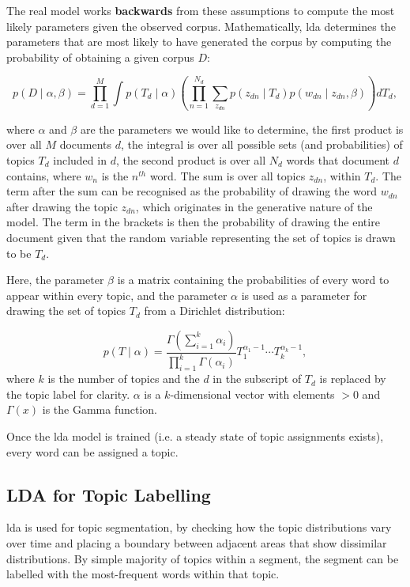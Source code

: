     The real \gls{model} works \textbf{backwards} from these assumptions to compute the most likely parameters given the observed corpus.
    Mathematically, \gls{lda} determines the parameters that are most likely to have generated the corpus by computing the probability of obtaining a given corpus $D$:

    \begin{equation}
        p(D \mid \alpha, \beta)=\prod_{d=1}^{M} \int p\left(T_{d} \mid \alpha\right)\left(\prod_{n=1}^{N_{d}} \sum_{z_{d n}} p\left(z_{d n} \mid T_{d}\right) p\left(w_{d n} \mid z_{d n}, \beta\right)\right) d T_{d},
    \end{equation}

    where $\alpha$ and $\beta$ are the parameters we would like to determine,
    the first product is over all $M$ documents $d$,
    the integral is over all possible sets (and probabilities) of topics $T_d$ included in $d$,
    the second product is over all $N_d$ words that document $d$ contains, where $w_n$ is the $n^{th}$ word.
    The sum is over all topics $z_{dn}$, within $T_d$.
    The term after the sum can be recognised as the probability of drawing the word $w_{dn}$ after drawing the topic $z_{dn}$, which originates in the generative nature of the \gls{model}.
    The term in the brackets is then the probability of drawing the entire document given that the random variable representing the set of topics is drawn to be $T_d$.

    Here, the parameter $\beta$ is a matrix containing the probabilities of every word to appear within every topic, and the parameter $\alpha$ is used as a parameter for drawing the set of topics $T_d$ from a Dirichlet distribution:

    \begin{equation}
        p(T \mid \alpha)=\frac{\Gamma\left(\sum_{i=1}^{k} \alpha_{i}\right)}{\prod_{i=1}^{k} \Gamma\left(\alpha_{i}\right)} T_{1}^{\alpha_{1}-1} \cdots T_{k}^{\alpha_{k}-1},
    \end{equation}
    where $k$ is the number of topics and the $d$ in the subscript of $T_d$ is replaced by the topic label for clarity. $\alpha$ is a $k$-dimensional vector with elements $> 0$ and $\Gamma(x)$ is the Gamma function.

    Once the \gls{lda} \gls{model} is trained (i.e. a steady state of topic assignments exists), every word can be assigned a topic.


    \subsection{LDA for Topic Labelling \label{ssec: lda for segmentation}}
    \gls{lda} is used for topic segmentation\cite{eisenstein2008bayesian, purver2006unsupervised, nguyen2012sits}, by checking how the topic distributions vary over time and placing a boundary between adjacent areas that show dissimilar distributions.
    By simple majority of topics within a segment, the segment can be labelled with the most-frequent words within that topic.

